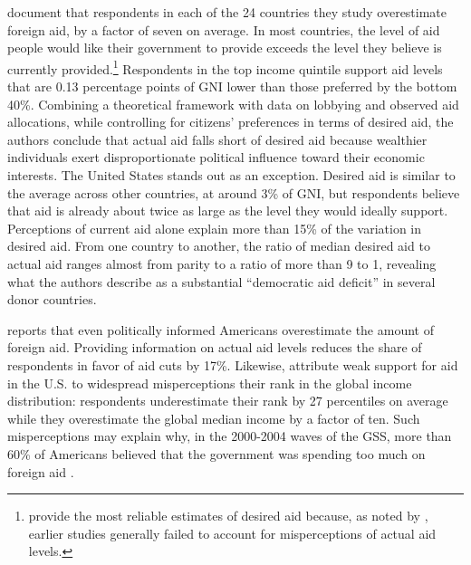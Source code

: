 

\citet{kaufmann_foreign_2019} document that respondents in each of the 24 countries they study overestimate foreign aid, by a factor of seven on average. In most countries, the level of aid people would like their government to provide exceeds the level they believe is currently provided.\footnote{\citet{kaufmann_foreign_2012} provide the most reliable estimates of desired aid because, as noted by \citet{hudson_mile_2012}, earlier studies generally failed to account for misperceptions of actual aid levels.} Respondents in the top income quintile support aid levels that are 0.13 percentage points of GNI lower than those preferred by the bottom 40\%. Combining a theoretical framework with data on lobbying and observed aid allocations, while controlling for citizens' preferences in terms of desired aid, the authors conclude that actual aid falls short of desired aid because wealthier individuals exert disproportionate political influence toward their economic interests. The United States stands out as an exception. Desired aid is similar to the average across other countries, at around 3\% of GNI, but respondents believe that aid is already about twice as large as the level they would ideally support. Perceptions of current aid alone explain more than 15\% of the variation in desired aid. From one country to another, the ratio of median desired aid to actual aid ranges almost from parity to a ratio of more than 9 to 1, revealing what the authors describe as a substantial ``democratic aid deficit'' in several donor countries.

\citet{gilens_political_2001} reports that even politically informed Americans overestimate the amount of foreign aid. Providing information on actual aid levels reduces the share of respondents in favor of aid cuts by 17\%. Likewise, \citet{nair_misperceptions_2018} attribute weak support for aid in the U.S. to widespread misperceptions their rank in the global income distribution: respondents underestimate their rank by 27 percentiles on average while they overestimate the global median income by a factor of ten. Such misperceptions may explain why, in the 2000-2004 waves of the GSS, more than 60\% of Americans believed that the government was spending too much on foreign aid \citep{okten_preferences_2007}.

